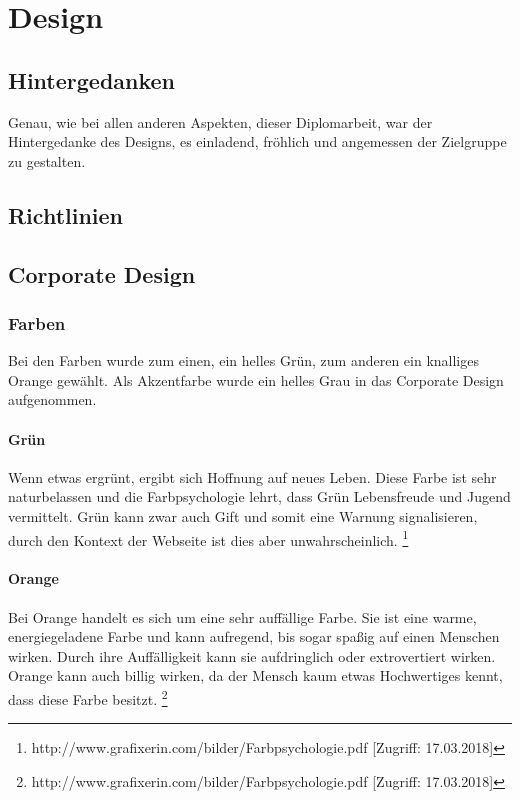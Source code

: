 \chapter{Design}
\renewcommand{\kapitelautor}{Autor: Niklas Kienreich}

\section{Hintergedanken}
\renewcommand{\kapitelautor}{Autor: Niklas Kienreich}
Genau, wie bei allen anderen Aspekten, dieser Diplomarbeit, war der Hintergedanke des Designs, es einladend, fröhlich und angemessen der Zielgruppe zu gestalten.

\section{Richtlinien}
\section{Corporate Design}
\subsection{Farben}
\renewcommand{\kapitelautor}{Autor: Niklas Kienreich}
Bei den Farben wurde zum einen, ein helles Grün, zum anderen ein knalliges Orange gewählt. Als Akzentfarbe wurde ein helles Grau in das Corporate Design aufgenommen.

\subsubsection{Grün}
\renewcommand{\kapitelautor}{Autor: Niklas Kienreich}
Wenn etwas ergrünt, ergibt sich Hoffnung auf neues Leben. Diese Farbe ist sehr naturbelassen und die Farbpsychologie lehrt, dass Grün Lebensfreude und Jugend vermittelt. Grün kann zwar auch Gift und somit eine Warnung signalisieren, durch den Kontext der Webseite ist dies aber unwahrscheinlich. \footnote{\label{foot:1} http://www.grafixerin.com/bilder/Farbpsychologie.pdf [Zugriff: 17.03.2018]}

\subsubsection{Orange}
\renewcommand{\kapitelautor}{Autor: Niklas Kienreich}
Bei Orange handelt es sich um eine sehr auffällige Farbe. Sie ist eine warme, energiegeladene Farbe und kann aufregend, bis sogar spaßig auf einen Menschen wirken. Durch ihre Auffälligkeit kann sie aufdringlich oder extrovertiert wirken. Orange kann auch billig wirken, da der Mensch kaum etwas Hochwertiges kennt, dass diese Farbe besitzt. \footnote{\label{foot:1} http://www.grafixerin.com/bilder/Farbpsychologie.pdf [Zugriff: 17.03.2018]}


